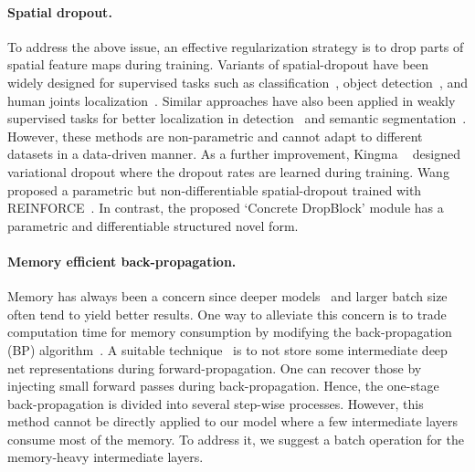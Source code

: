 \documentclass[10pt,twocolumn,letterpaper]{article}
\begin{document}
\vspace{-1em}
\paragraph{Spatial dropout.}
To address the above issue, an effective regularization strategy is to drop parts of spatial feature maps during training. Variants of spatial-dropout have been widely designed for supervised tasks such as classification~\cite{dropblock}, object detection~\cite{a-fast-rcnn}, and human joints localization~\cite{TompsonGJLB15}. Similar approaches have also been applied in weakly supervised tasks for better localization in detection~\cite{singh-iccv2017} and semantic segmentation~\cite{WeiFLCZY17}. However, these methods are non-parametric and cannot adapt to different datasets in a data-driven manner. As a further improvement, Kingma \etal~\cite{varitional-db} designed variational dropout where the dropout rates are learned during training. Wang \etal~\cite{a-fast-rcnn} proposed a parametric but non-differentiable spatial-dropout trained with REINFORCE~\cite{reinforce}. In contrast, the proposed `Concrete DropBlock' module has a parametric and differentiable structured novel form.

\vspace{-1em}
\paragraph{\textbf{Memory efficient back-propagation.}}
Memory has always been a concern since deeper models~\cite{resnet,vgg} and larger batch size~\cite{Peng_2018_CVPR} often tend to yield better results. One way to alleviate this concern is to trade computation time for memory consumption by modifying the back-propagation (BP) algorithm~\cite{Rumelhart}. A suitable technique~\cite{Kokkinos17,PleissCHLMW17, ChenXZG16} is to not store some intermediate deep net representations during forward-propagation. One can recover those by injecting small forward passes during  back-propagation. Hence, the one-stage back-propagation is divided into several step-wise processes. However, this method cannot be directly applied to our model where a few intermediate layers consume most of the memory. To address it, we suggest a batch operation for the memory-heavy intermediate layers. 
\end{document}
